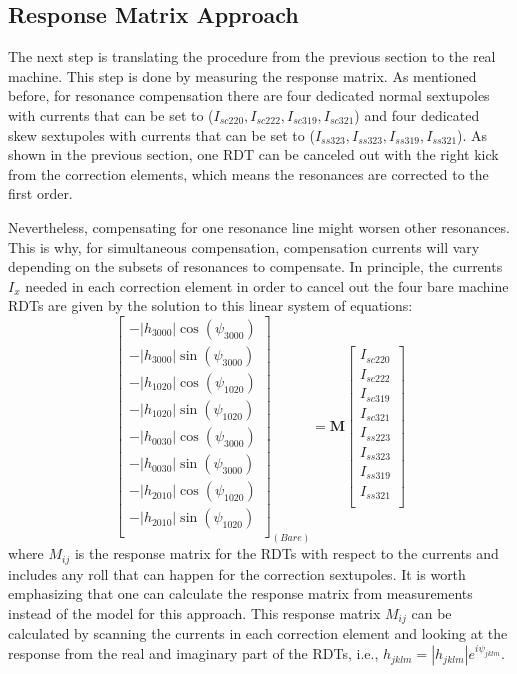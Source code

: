 \subsection{Response Matrix Approach}

The next step is translating the procedure from the previous section to the real machine. This step is done by measuring the response matrix. As mentioned before, for resonance compensation there are four dedicated normal sextupoles with currents that can be set to ($I_{sc220},I_{sc222},I_{sc319},I_{sc321}$) and four dedicated skew sextupoles with currents that can be set to ($I_{ss323},I_{ss323},I_{ss319},I_{ss321}$). As shown in the previous section, one RDT can be canceled out with the right kick from the correction elements, which means the resonances are corrected to the first order. 

Nevertheless, compensating for one resonance line might worsen other resonances. This is why, for simultaneous compensation, compensation currents will vary depending on the subsets of resonances to compensate. In principle, the currents $I_x$ needed in each correction element in order to cancel out the four bare machine RDTs are given by the solution to this linear system of equations: 
\begin{equation}
    \begin{bmatrix}
        -|{h_{3000}}|  \cos (\psi_{3000})\\
        -|{h_{3000}}|  \sin (\psi_{3000})\\
        -|{h_{1020}}|  \cos (\psi_{1020})\\
        -|{h_{1020}}|  \sin (\psi_{1020})\\
        -|{h_{0030}}|  \cos (\psi_{3000})\\
        -|{h_{0030}}|  \sin (\psi_{3000})\\
        -|{h_{2010}}|  \cos (\psi_{1020})\\
        -|{h_{2010}}|  \sin (\psi_{1020})\\
      \end{bmatrix}_{(Bare)}
    =
      \boldsymbol{M}
    \begin{bmatrix}
        I_{sc220} \\
        I_{sc222} \\
        I_{sc319} \\
        I_{sc321} \\
        I_{ss223} \\
        I_{ss323} \\
        I_{ss319} \\
        I_{ss321} \\
      \end{bmatrix}
    \label{eq:system}
\end{equation}
where $M_{ij}$ is the response matrix for the RDTs with respect to the currents and includes any roll that can happen for the correction sextupoles. It is worth emphasizing that one can calculate the response matrix from measurements instead of the model for this approach. This response matrix $M_{ij}$ can be calculated by scanning the currents in each correction element and looking at the response from the real and imaginary part of the RDTs, i.e., $h_{jklm}=|h_{jklm}|e^{i\psi_{jklm}}$. 

